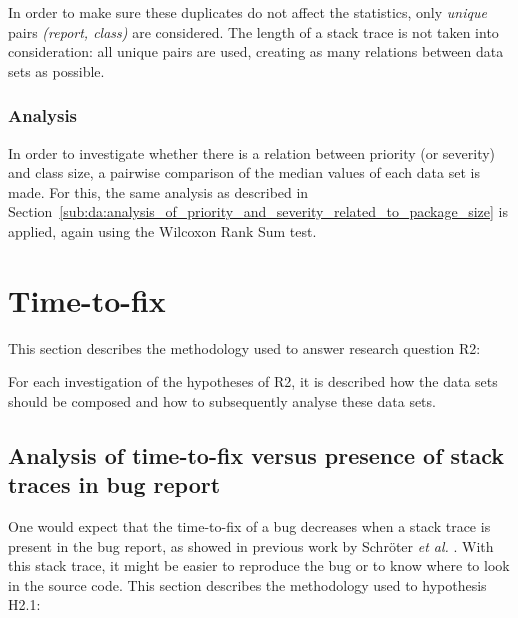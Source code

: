 In order to make sure these duplicates do not affect the statistics, only \emph{unique} pairs \emph{(report, class)} are considered. The length of a stack trace is not taken into consideration: all unique pairs are used, creating as many relations between data sets as possible.

\subsubsection{Analysis}
In order to investigate whether there is a relation between priority (or severity) and class size, a pairwise comparison of the median values of each data set is made. For this, the same analysis as described in Section~\ref{sub:da:analysis_of_priority_and_severity_related_to_package_size} is applied, again using the Wilcoxon Rank Sum test. 



\section{Time-to-fix} %
\label{sec:analysis:time_to_fix}
This section describes the methodology used to answer research question R2:

\vspace{\baselineskip}
\questionb{}
\vspace{\baselineskip}

For each investigation of the hypotheses of R2, it is described how the data sets should be composed and how to subsequently analyse these data sets.

\subsection{Analysis of time-to-fix versus presence of stack traces in bug report} %
\label{sub:da:analysis_of_time_to_fix_versus_presence_of_stack_traces_in_bug_report}
One would expect that the time-to-fix of a bug decreases when a stack trace is present in the bug report, as showed in previous work by Schr\"{o}ter \emph{et al.} \cite{Schroter2010}. With this stack trace, it might be easier to reproduce the bug or to know where to look in the source code. This section describes the methodology used to hypothesis H2.1:

\vspace{\baselineskip}
\hypba{}

